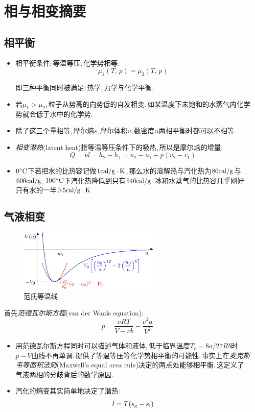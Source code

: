 \chapter{相与相变摘要}


\section{相平衡}

\begin{itemize}
	\item 相平衡条件:\,等温等压,\,化学势相等:\,
	\[\mu_1(T,\,p)=\mu_2(T,\,p)\]

	即三种平衡同时被满足:\,热学,\,力学与化学平衡.

	\item 若$\mu_1>\mu_2$,\,粒子从势高的向势低的自发相变.\,如某温度下未饱和的水蒸气内化学势就会低于水中的化学势.

	\item 除了这三个量相等,\,摩尔熵$s$,\,摩尔体积$v$,\,数密度$n$两相平衡时都可以不相等.

	\item \emph{相变潜热}(latent heat)指等温等压条件下的吸热,\,所以是摩尔焓的增量:
	\[Q=\nu l=h_2-h_1=u_2-u_1+p(v_2-v_1)\]

	\item $0^\circ \mathrm{C}$下若把水的比热容记做$1{\rm cal/g\cdot K}$,\,那么水的溶解热与汽化热为$80{\rm cal/g}$与$600{\rm cal/g}$,\,$100^\circ \mathrm{C}$下汽化热降低到只有$540{\rm cal/g}$.\,冰和水蒸气的比热容几乎刚好只有水的一半$0.5{\rm cal/g\cdot K}$
\end{itemize}

\section{气液相变}
\begin{figure}
\centering
\includegraphics[width=7cm]{image/5-3-6.png}
\caption{范氏等温线}
\end{figure}
首先\emph{范德瓦尔斯方程}(van der Waals equation):
\[p=\frac{\nu RT}{V-\nu b}-\frac{\nu^2 a}{V^2}\]
\begin{itemize}
	\item 用范德瓦尔斯方程同时可以描述气体和液体,\,低于临界温度$T_c=8a/27Rb$时$p-V$曲线不再单调.\,提供了等温等压等化学势相平衡的可能性.\,事实上在\emph{麦克斯韦等面积法则}(Maxwell's equal area rule)决定的两点处能够相平衡.\,这定义了气液两相的分歧背后的数学原因.
	\item 汽化的熵变其实简单地决定了潜热:
	\[l=T(s_{\rm g}-s_{\rm l})\]
	\end{itemize}


